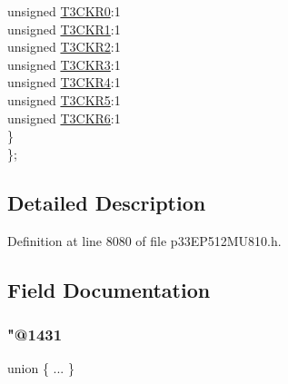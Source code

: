 \begin{DoxyCompactItemize}
\begin{tabbing}
\>\>unsigned \hyperlink{structtag_r_p_i_n_r3_b_i_t_s_a4cc8615d3808d074f629d9fed7722ba4}{T3CKR0}:1\\
\>\>unsigned \hyperlink{structtag_r_p_i_n_r3_b_i_t_s_aa862500a989322f4da685a29641dc55f}{T3CKR1}:1\\
\>\>unsigned \hyperlink{structtag_r_p_i_n_r3_b_i_t_s_a365baf5cf76c981ee7561aa21f4fa652}{T3CKR2}:1\\
\>\>unsigned \hyperlink{structtag_r_p_i_n_r3_b_i_t_s_a75d714fa0fb24f66d600986165f202bb}{T3CKR3}:1\\
\>\>unsigned \hyperlink{structtag_r_p_i_n_r3_b_i_t_s_ad0ed604bb74bc5f931c108a48459e922}{T3CKR4}:1\\
\>\>unsigned \hyperlink{structtag_r_p_i_n_r3_b_i_t_s_a9669831d8dd04b2b2f8dbf0d1d2c7bbb}{T3CKR5}:1\\
\>\>unsigned \hyperlink{structtag_r_p_i_n_r3_b_i_t_s_a275a5f0196b1fd371bbdd26051395f44}{T3CKR6}:1\\
\>\} \\
\}; \\

\end{tabbing}\end{DoxyCompactItemize}


\subsection{Detailed Description}


Definition at line 8080 of file p33\+E\+P512\+M\+U810.\+h.



\subsection{Field Documentation}
\mbox{\label{structtag_r_p_i_n_r3_b_i_t_s_af05be85942ff4f1a668db4fc1aa79e00}} 
\subsubsection{\texorpdfstring{"@1431}{@1431}}
{\footnotesize\ttfamily union \{ ... \} }

\mbox{\label{structtag_r_p_i_n_r3_b_i_t_s_adf71f3d8410c1f1dbbc96680a92c49af}} 
